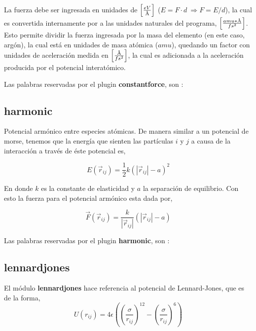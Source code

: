 La fuerza debe ser ingresada en unidades de $\left[eV \over \text\AA\right]$
($E=F\cdot d\ \Rightarrow F=E/d$), la cual es convertida internamente por
{\lpmd} a las unidades naturales del programa, $\left[amu*\text\AA\over
fs^2\right]$. Esto permite dividir la fuerza ingresada por la masa del elemento
(en este caso, arg\'on), la cual est\'a en unidades de masa at\'omica ($amu$),
quedando un factor con unidades de aceleraci\'on medida en $\left[\text\AA\over
fs^2\right]$, la cual es adicionada a la aceleraci\'on producida por el
potencial interat\'omico.


Las palabras reservadas por el plugin \textbf{constantforce}, son :


\subsection{harmonic}
Potencial arm\'onico entre especies at\'omicas. De manera similar a un potencial
de morse, tenemos que la energ\'ia que sienten las part\'iculas $i$ y $j$ a
causa de la interacci\'on a trav\'es de \'este potencial es,

$$E(\vec{r}_{ij}) = \frac{1}{2}k\left(|\vec{r}_{ij}|-a\right)^2$$

En donde $k$ es la constante de elasticidad y $a$ la separaci\'on de equilibrio.
Con esto la fuerza para el potencial arm\'onico esta dada por,

$$\vec{F}(\vec{r}_{ij}) = \frac{k}{|\vec{r}_{ij}|}\left(|\vec{r}_{ij}|-a\right)$$

Las palabras reservadas por el plugin \textbf{harmonic}, son :


\subsection{lennardjones}
El m\'odulo \textbf{lennardjones} hace referencia al potencial de Lennard-Jones,
que es de la forma,
$$U(r_{ij}) =
4\epsilon\left(\left(\frac{\sigma}{r_{ij}}\right)^{12}-\left(\frac{\sigma}{r_{ij
}}\right)^6\right)$$

